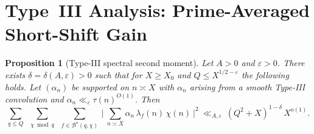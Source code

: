 \documentclass[11pt]{article}
\newtheorem{proposition}[lemma]{Proposition}
\theoremstyle{definition}
\theoremstyle{remark}
\numberwithin{equation}{part}
\begin{document}
\section{Type~III Analysis: Prime-Averaged Short-Shift Gain}

\begin{proposition}[Type-III spectral second moment]\label{prop:typeIII}
	Let $A>0$ and $\varepsilon>0$. There exists $\delta=\delta(A,\varepsilon)>0$ such that for $X\ge X_0$ and $Q\le X^{1/2-\varepsilon}$ the following holds.
	Let $(\alpha_n)$ be supported on $n\asymp X$ with $\alpha_n$ arising from a smooth Type-III convolution and $\alpha_n\ll_\varepsilon \tau(n)^{O(1)}$.
	Then
	\begin{equation}\label{eq:typeIII-bound}
		\sum_{q\le Q}\ \sum_{\substack{\chi\bmod q}}\ \sum_{f\in\mathcal B^\star(q,\chi)}\ \Bigg|\ \sum_{n\asymp X}\alpha_n\,\lambda_f(n)\,\chi(n)\ \Bigg|^2
		\ \ll_{A,\varepsilon}\ (Q^2+X)^{1-\delta}\,X^{o(1)}.
	\end{equation}
\end{proposition}
\end{document}
